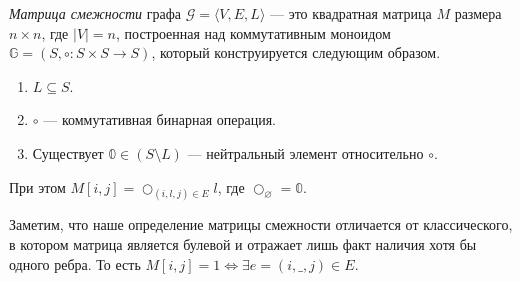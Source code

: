 \begin{definition}
  \textit{Матрица смежности} графа $\mathcal{G}=\langle V,E,L \rangle$ --- это квадратная матрица $M$ размера $n \times n$, где $|V| = n$, построенная над коммутативным моноидом $\mathbb{G} = (S,\circ\colon S \times S \to S)$, который конструируется следующим образом.

  \begin{enumerate}
    \item $L \subseteq S$.
    \item $\circ$ --- коммутативная бинарная операция.
    \item Существует $ \mathbb{0} \in (S \setminus L)$ --- нейтральный элемент относительно $\circ$.    
  \end{enumerate}

  При этом $M[i,j] = \bigcirc_{(i,l,j) \in E}l$, где $\bigcirc_\varnothing = \mathbb{0}$.
\end{definition}

Заметим, что наше определение матрицы смежности отличается от классического, в котором матрица является булевой и отражает лишь факт наличия хотя бы одного ребра. То есть $M[i,j] = 1 \iff \exists e = (i,\_,j) \in E$.

